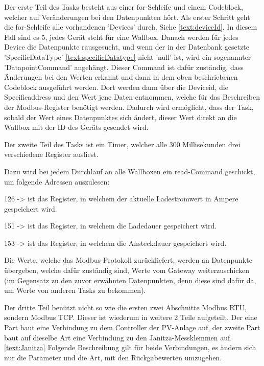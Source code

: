 Der erste Teil des Tasks besteht aus einer for-Schleife und einem Codeblock, welcher auf Veränderungen bei den Datenpunkten hört. Als erster Schritt geht die for-Schleife alle vorhandenen 'Devices' durch. Siehe \ref{text:deviceId}. In diesem Fall sind es 5, jedes Gerät steht für eine Wallbox. Danach werden für jedes Device die Datenpunkte rausgesucht, und wenn der in der Datenbank gesetzte 'SpecificDataType' \ref{text:specificDatatype} nicht 'null' ist, wird ein sogenannter 'DatapointCommand' angehängt. Dieser Command ist dafür zuständig, dass Änderungen bei den Werten erkannt und dann in dem oben beschriebenen Codeblock ausgeführt werden. Dort werden dann über die Deviceid, die Specificaddress und den Wert jene Daten entnommen, welche für das Beschreiben der Modbus-Register benötigt werden. Dadurch wird ermöglicht, dass der Task, sobald der Wert eines Datenpunktes sich ändert, dieser Wert direkt an die Wallbox mit der ID des Geräts gesendet wird.


Der zweite Teil des Tasks ist ein Timer, welcher alle 300 Millisekunden drei verschiedene Register ausliest.


Dazu wird bei jedem Durchlauf an alle Wallboxen ein read-Command geschickt, um folgende Adressen auszulesen:


\begin{compactitem}
\item 126 -> ist das Register, in welchem der aktuelle Ladestromwert in Ampere gespeichert wird.
\item 151 -> ist das Register, in welchem die Ladedauer gespeichert wird.
\item 153 -> ist das Register, in welchem die Ansteckdauer gespeichert wird.
\end{compactitem}




Die Werte, welche das Modbus-Protokoll zurückliefert, werden an Datenpunkte übergeben, welche dafür zuständig sind, Werte vom Gateway weiterzuschicken (im Gegensatz zu den zuvor erwähnten Datenpunkten, denn diese sind dafür da, um Werte von anderen Tasks zu bekommen).


Der dritte Teil benützt nicht so wie die ersten zwei Abschnitte Modbus RTU, sondern Modbus TCP. Dieser ist wiederum in weitere 2 Teile aufgeteilt. Der eine Part baut eine Verbindung zu dem Controller der PV-Anlage auf, der zweite Part baut auf dieselbe Art eine Verbindung zu den Janitza-Messklemmen auf. \ref{text:Janitza} Folgende Beschreibung gilt für beide Verbindungen, es ändern sich nur die Parameter und die Art, mit den Rückgabewerten umzugehen.


